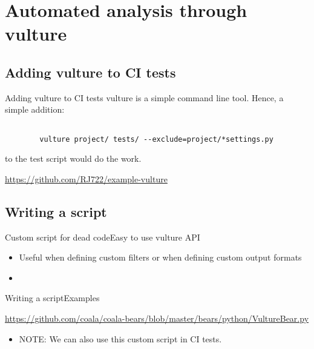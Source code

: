 \documentclass{beamer}
\begin{document}
\section{Automated analysis through vulture}

\subsection{Adding vulture to CI tests}

\begin{frame}{Adding vulture to CI tests}
    vulture is a simple command line tool.
    Hence, a simple addition:

    \begin{verbatim}

        vulture project/ tests/ --exclude=project/*settings.py

    \end{verbatim}

    to the test script would do the work.

    \begin{example}
        \url{https://github.com/RJ722/example-vulture}
    \end{example}

\end{frame}

\subsection{Writing a script}

\begin{frame}{Custom script for dead code}{Easy to use vulture API}
    \begin{itemize}
        \item Useful when defining custom filters \pause or when defining custom output formats
        \pause
        \item \inputminted{python}{content/custom_script.py}
    \end{itemize}
\end{frame}

\begin{frame}{Writing a script}{Examples}
    \begin{example}
        \url{https://github.com/coala/coala-bears/blob/master/bears/python/VultureBear.py}
    \end{example}
    \pause
    \begin{itemize}
        \item NOTE: We can also use this custom script in CI tests.
    \end{itemize}
\end{frame}
\end{document}
